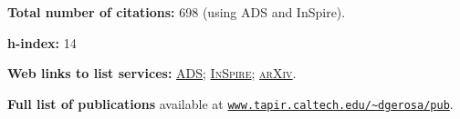 \documentclass[letterpaper]{moderncv}
\begin{document}
\textbf{Total number of citations:} 698 (using ADS and InSpire).

\textbf{h-index:} 14


\textbf{Web links to list services:}
\href{http://labs.adsabs.harvard.edu/adsabs/search/?q=author%3A%22Gerosa%2C+Davide%22&month_from=&year_from=&month_to=&year_to=&db_f=&nr=&article=1&bigquery=&re_sort_type=CITED&re_sort_dir=desc}{\textsc{ADS}};
\href{http://inspirehep.net/search?ln=en&ln=en&p=exactauthor%3AD.Gerosa.1&of=hb&action_search=Search&sf=&so=d&rm=citation&rg=25&sc=0}{\textsc{InSpire}};
\href{http://arxiv.org/a/gerosa_d_1.html}{\textsc{arXiv}}.

\textbf{Full list of publications} available at \href{http://www.tapir.caltech.edu/~dgerosa/pub}{\texttt{www.tapir.caltech.edu/\textasciitilde dgerosa/pub}}.






\vspace{+0.2cm}
\cvitem{\textcolor{color1}{Selected publications}}{}
\vspace{-0.7cm}
\end{document}
